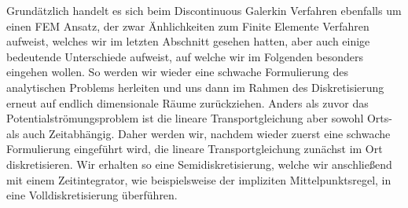 Grundätzlich handelt es sich beim Discontinuous Galerkin Verfahren ebenfalls um einen FEM Ansatz, der zwar Änhlichkeiten zum Finite Elemente Verfahren aufweist, welches wir im letzten Abschnitt gesehen hatten, aber auch einige bedeutende Unterschiede aufweist, auf welche wir im Folgenden besonders eingehen wollen. 
So werden wir wieder eine schwache Formulierung des analytischen Problems herleiten und uns dann im Rahmen des Diskretisierung erneut auf endlich dimensionale Räume zurückziehen.
Anders als zuvor das Potentialströmungsproblem ist die lineare Transportgleichung  aber sowohl Orts- als auch Zeitabhängig. Daher werden wir, nachdem wieder zuerst eine schwache Formulierung eingeführt wird,  die lineare Transportgleichung zunächst im Ort diskretisieren. Wir erhalten so eine Semidiskretisierung, welche wir anschließend mit einem Zeitintegrator, wie beispielsweise der impliziten Mittelpunktsregel, in eine Volldiskretisierung überführen.
 

